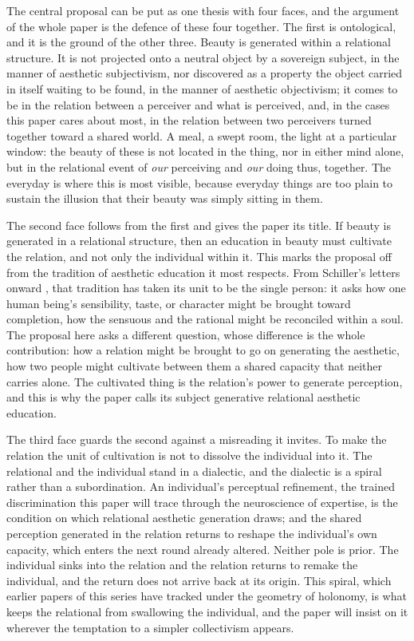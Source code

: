 The central proposal can be put as one thesis with four faces, and the argument of the whole paper is the defence of these four together. The first is ontological, and it is the ground of the other three. Beauty is generated within a relational structure. It is not projected onto a neutral object by a sovereign subject, in the manner of aesthetic subjectivism, nor discovered as a property the object carried in itself waiting to be found, in the manner of aesthetic objectivism; it comes to be in the relation between a perceiver and what is perceived, and, in the cases this paper cares about most, in the relation between two perceivers turned together toward a shared world. A meal, a swept room, the light at a particular window: the beauty of these is not located in the thing, nor in either mind alone, but in the relational event of \emph{our} perceiving and \emph{our} doing thus, together. The everyday is where this is most visible, because everyday things are too plain to sustain the illusion that their beauty was simply sitting in them.

The second face follows from the first and gives the paper its title. If beauty is generated in a relational structure, then an education in beauty must cultivate the relation, and not only the individual within it. This marks the proposal off from the tradition of aesthetic education it most respects. From Schiller's letters onward \parencite{schiller1967}, that tradition has taken its unit to be the single person: it asks how one human being's sensibility, taste, or character might be brought toward completion, how the sensuous and the rational might be reconciled within a soul. The proposal here asks a different question, whose difference is the whole contribution: how a relation might be brought to go on generating the aesthetic, how two people might cultivate between them a shared capacity that neither carries alone. The cultivated thing is the relation's power to generate perception, and this is why the paper calls its subject generative relational aesthetic education.

The third face guards the second against a misreading it invites. To make the relation the unit of cultivation is not to dissolve the individual into it. The relational and the individual stand in a dialectic, and the dialectic is a spiral rather than a subordination. An individual's perceptual refinement, the trained discrimination this paper will trace through the neuroscience of expertise, is the condition on which relational aesthetic generation draws; and the shared perception generated in the relation returns to reshape the individual's own capacity, which enters the next round already altered. Neither pole is prior. The individual sinks into the relation and the relation returns to remake the individual, and the return does not arrive back at its origin. This spiral, which earlier papers of this series have tracked under the geometry of holonomy, is what keeps the relational from swallowing the individual, and the paper will insist on it wherever the temptation to a simpler collectivism appears.

